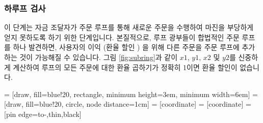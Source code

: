 \documentclass{article}
\makeatletter
\newenvironment{figurehere}
{\def\@captype{figure}}
\makeatother
\begin{document}
\begin{multicols}{2}
\subsubsection{하루프 검사\label{sec:sub_ring_check}}
\indent 이 단계는 자금 조달자가 주문 루프를 통해 새로운 주문을 수행하여 마진을 부당하게 얻지 못하도록 하기 위한 단계입니다. 본질적으로, 루프 광부들이 합법적인 주문 루프를 하나 발견하면, 사용자의 이익 (환율 할인 ) 을 위해 다른 주문을 주문 루프에 추가하는 것이 가능해질 수 있습니다. 그림 \ref{fig:subring}과 같이 $x1$, $y1$, $x2$ 및 $y2$를 신중하게 계산하여 루프의 모든 주문에 대한 환율 곱하기가 정확히 1이면 환율 할인이 없습니다.
\begin{center}
	\begin{figurehere}
		\centering
		 = [draw, fill=blue!20, rectangle, 
		minimum height=3em, minimum width=6em]
		 = [draw, fill=blue!20, circle, node distance=1cm]
		 = [coordinate]
		 = [coordinate]
		 = [pin edge={to-,thin,black}]
		
\end{figurehere}
\end{center}
\end{multicols}
\end{document}
